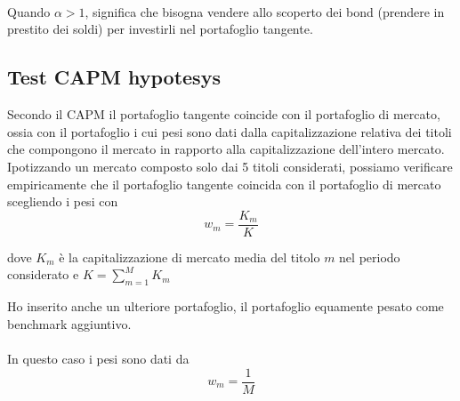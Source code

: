 \documentclass[compress]{beamer}
\begin{document}
\begin{frame}{\subsecname}
\begin{minipage}{0.30\textwidth}
	\end{minipage} \\ \\ \\
	Quando \(\alpha>1\), significa che bisogna vendere allo scoperto dei bond (prendere in prestito dei soldi) per investirli nel portafoglio tangente.
\end{frame}

\subsection{Test CAPM hypotesys}
\begin{frame}{\subsecname}
	Secondo il CAPM il portafoglio tangente coincide con il portafoglio di mercato, ossia con il portafoglio
i cui pesi sono dati dalla capitalizzazione relativa dei titoli che compongono il mercato in rapporto alla
capitalizzazione dell'intero mercato. \\

Ipotizzando un mercato composto solo dai 5 titoli considerati, possiamo verificare empiricamente che il portafoglio tangente coincida con il portafoglio di mercato scegliendo i pesi con
\[
w_m = \frac{K_m}{K}
\]

dove \(K_m\) è la capitalizzazione di mercato media del titolo \(m\) nel periodo considerato e \(K = \sum_{m=1}^{M} K_m\)
\end{frame}

\begin{frame}{\subsecname}
	Ho inserito anche un ulteriore portafoglio, il portafoglio equamente pesato come benchmark aggiuntivo. \\ \\
	In questo caso i pesi sono dati da
\[
w_m = \frac{1}{M}
\]
\end{frame}
\end{document}
